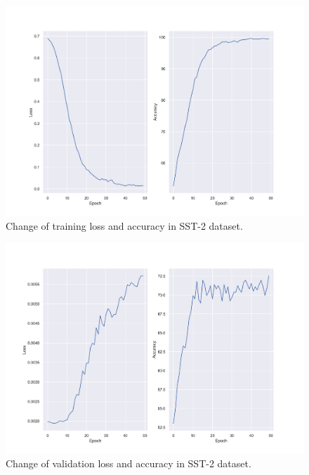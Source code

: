 \begin{figure}
    \centering
    \includegraphics[width=0.8\linewidth]{../images/sst2-train-loss-acc.png}
    \caption{Change of training loss and accuracy in SST-2 dataset.}
    \label{fig:sst-train_loss}
\end{figure}
\begin{figure}
    \centering
    \includegraphics[width=0.8\linewidth]{../images/sst2-dev-loss-acc.png}
    \caption{Change of validation loss and accuracy in SST-2 dataset.}
    \label{fig:sst-dev_loss}
\end{figure}

